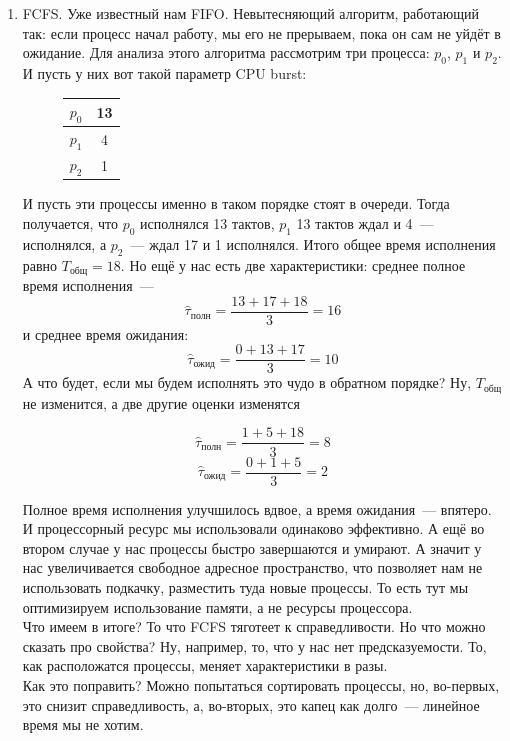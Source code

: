 \documentclass{article}
\begin{document}
    \begin{enumerate}
        \item FCFS. Уже известный нам FIFO. Невытесняющий алгоритм, работающий так: если процесс начал работу, мы его не прерываем, пока он сам не уйдёт в ожидание. Для анализа этого алгоритма рассмотрим три процесса: $p_0$, $p_1$ и $p_2$. И пусть у них вот такой параметр CPU burst:
        \begin{figure}[H]
            \begin{tabular}{|c|c|}
                \hline
                $p_0$ & 13\\
                \hline
                $p_1$ & 4\\
                \hline
                $p_2$ & 1\\
                \hline
            \end{tabular}
        \end{figure}
        И пусть эти процессы именно в таком порядке стоят в очереди. Тогда получается, что $p_0$ исполнялся 13 тактов, $p_1$ 13 тактов ждал и 4~--- исполнялся, а $p_2$~--- ждал 17 и 1 исполнялся. Итого общее время исполнения равно $T_{\text{общ}}=18$. Но ещё у нас есть две характеристики: среднее полное время исполнения~---
        $$\hat\tau_{\text{полн}}=\frac{13+17+18}3=16$$
        и среднее время ожидания:
        $$\hat\tau_{\text{ожид}}=\frac{0+13+17}3=10$$
        А что будет, если мы будем исполнять это чудо в обратном порядке? Ну, $T_{\text{общ}}$ не изменится, а две другие оценки изменятся
        \begin{multicols}{2}
            $$\hat\tau_{\text{полн}}=\frac{1+5+18}3=8$$
            \columnbreak
            $$\hat\tau_{\text{ожид}}=\frac{0+1+5}3=2$$
        \end{multicols}
        Полное время исполнения улучшилось вдвое, а время ожидания~--- впятеро. И процессорный ресурс мы использовали одинаково эффективно. А ещё во втором случае у нас процессы быстро завершаются и умирают. А значит у нас увеличивается свободное адресное пространство, что позволяет нам не использовать подкачку, разместить туда новые процессы. То есть тут мы оптимизируем использование памяти, а не ресурсы процессора.\\
        Что имеем в итоге? То что FCFS тяготеет к справедливости. Но что можно сказать про свойства? Ну, например, то, что у нас нет предсказуемости. То, как расположатся процессы, меняет характеристики в разы.\\
        Как это поправить? Можно попытаться сортировать процессы, но, во-первых, это снизит справедливость, а, во-вторых, это капец как долго~--- линейное время мы не хотим.

\end{enumerate}
\end{document}
